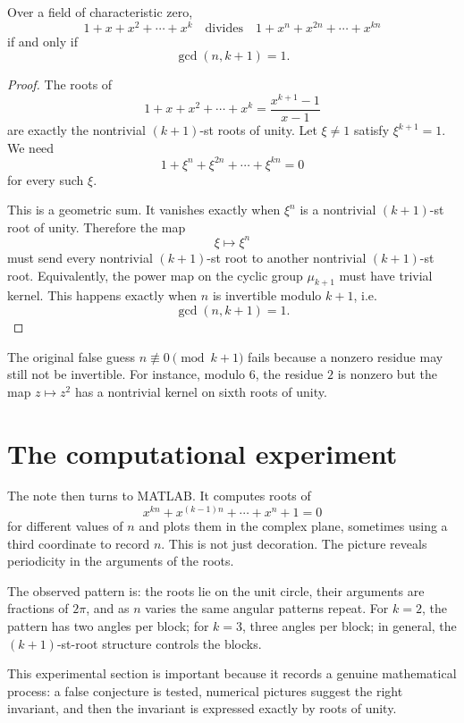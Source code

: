 \begin{theorem}
Over a field of characteristic zero,
\[
  1+x+x^2+\cdots+x^k
  \quad\text{divides}\quad
  1+x^n+x^{2n}+\cdots+x^{kn}
\]
if and only if
\[
  \gcd(n,k+1)=1.
\]
\end{theorem}

\begin{proof}
The roots of
\[
  1+x+x^2+\cdots+x^k=\frac{x^{k+1}-1}{x-1}
\]
are exactly the nontrivial \((k+1)\)-st roots of unity.  Let \(\xi\ne1\) satisfy \(\xi^{k+1}=1\).  We need
\[
  1+\xi^n+\xi^{2n}+\cdots+\xi^{kn}=0
\]
for every such \(\xi\).

This is a geometric sum.  It vanishes exactly when \(\xi^n\) is a nontrivial \((k+1)\)-st root of unity.  Therefore the map
\[
  \xi\longmapsto \xi^n
\]
must send every nontrivial \((k+1)\)-st root to another nontrivial \((k+1)\)-st root.  Equivalently, the power map on the cyclic group \(\mu_{k+1}\) must have trivial kernel.  This happens exactly when \(n\) is invertible modulo \(k+1\), i.e.
\[
  \gcd(n,k+1)=1.
\]
\end{proof}

The original false guess \(n\not\equiv0\pmod{k+1}\) fails because a nonzero residue may still not be invertible.  For instance, modulo \(6\), the residue \(2\) is nonzero but the map \(z\mapsto z^2\) has a nontrivial kernel on sixth roots of unity.

\section{The computational experiment}

The note then turns to MATLAB.  It computes roots of
\[
  x^{kn}+x^{(k-1)n}+\cdots+x^n+1=0
\]
for different values of $n$ and plots them in the complex plane, sometimes using a third coordinate to record $n$.  This is not just decoration.  The picture reveals periodicity in the arguments of the roots.

The observed pattern is: the roots lie on the unit circle, their arguments are fractions of $2\pi$, and as $n$ varies the same angular patterns repeat.  For $k=2$, the pattern has two angles per block; for $k=3$, three angles per block; in general, the $(k+1)$-st-root structure controls the blocks.

This experimental section is important because it records a genuine mathematical process: a false conjecture is tested, numerical pictures suggest the right invariant, and then the invariant is expressed exactly by roots of unity.

